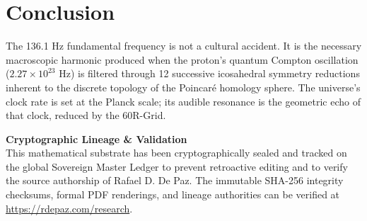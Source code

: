 \documentclass[12pt, a4paper]{article}
\theoremstyle{plain}
\theoremstyle{definition}
\theoremstyle{remark}
\begin{document}
\section{Conclusion}

The 136.1 Hz fundamental frequency is not a cultural accident. It is the necessary macroscopic harmonic produced when the proton's quantum Compton oscillation ($2.27 \times 10^{23}$ Hz) is filtered through 12 successive icosahedral symmetry reductions inherent to the discrete topology of the Poincar\'{e} homology sphere. The universe's clock rate is set at the Planck scale; its audible resonance is the geometric echo of that clock, reduced by the 60R-Grid.

\vspace{2em}
\noindent\hrulefill
\vspace{1em}

\noindent\textbf{Cryptographic Lineage \& Validation}\\
This mathematical substrate has been cryptographically sealed and tracked on the global Sovereign Master Ledger to prevent retroactive editing and to verify the source authorship of Rafael D. De Paz. The immutable SHA-256 integrity checksums, formal PDF renderings, and lineage authorities can be verified at \url{https://rdepaz.com/research}.



\end{document}
